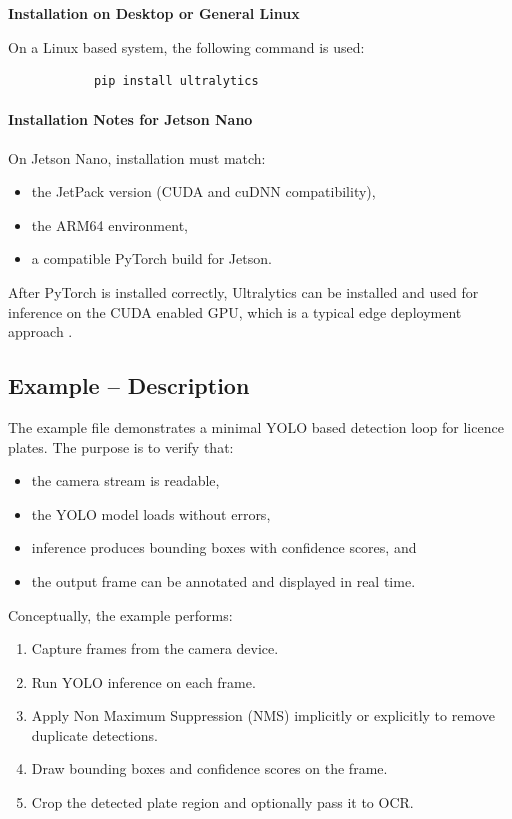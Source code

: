 \textbf{Installation on Desktop or General Linux}

On a Linux based system, the following command is used: 
\begin{tcolorbox}[colback=white, colframe=black, coltext=ShellColor, sharp corners, boxrule=0.8pt]
	\begin{small}
		\begin{verbatim}
			pip install ultralytics
		\end{verbatim}
	\end{small}
\end{tcolorbox}

\paragraph{Installation Notes for Jetson Nano}
On Jetson Nano, installation must match:
\begin{itemize}
	\item the JetPack version (CUDA and cuDNN compatibility),
	\item the ARM64 environment,
	\item a compatible PyTorch build for Jetson.
\end{itemize}
After PyTorch is installed correctly, Ultralytics can be installed and used for inference on the CUDA enabled GPU, which is a typical edge deployment approach \cite{ultralytics_issue_paper}.

\subsection{Example -- Description}

The example file  demonstrates a minimal YOLO based detection loop for licence plates. The purpose is to verify that:
\begin{itemize}
	\item the camera stream is readable,
	\item the YOLO model loads without errors,
	\item inference produces bounding boxes with confidence scores, and
	\item the output frame can be annotated and displayed in real time.
\end{itemize}

Conceptually, the example performs:
\begin{enumerate}
	\item Capture frames from the camera device.
	\item Run YOLO inference on each frame.
	\item Apply Non Maximum Suppression (NMS) implicitly or explicitly to remove duplicate detections.
	\item Draw bounding boxes and confidence scores on the frame.
	\item Crop the detected plate region and optionally pass it to OCR.
\end{enumerate}


